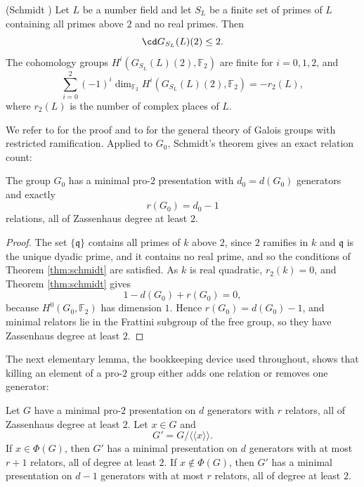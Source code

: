 \begin{theorem}\label{thm:schmidt}
(Schmidt \cite{Schmidt})  Let $L$ be a number field and let $S_L$ be a finite set of primes of $L$ containing all primes above $2$ and no real primes.  Then
\[
   \cd G_{S_L}(L)(2)\leq2.
\]
The cohomology groups $H^i(G_{S_L}(L)(2),\mathbb{F}_2)$ are finite for $i=0,1,2$, and
\[
  \sum_{i=0}^2(-1)^i\dim_{\mathbb{F}_2}H^i(G_{S_L}(L)(2),\mathbb{F}_2)=-r_2(L),
\]
where $r_2(L)$ is the number of complex places of $L$.
\end{theorem}

We refer to \cite{Schmidt} for the proof and to \cite[Chapters VIII and X]{NSW} for the general theory of Galois groups with restricted ramification.  Applied to $G_0$, Schmidt's theorem gives an exact relation count:

\begin{lemma}\label{lem:base}
The group $G_0$ has a minimal pro-$2$ presentation with $d_0=d(G_0)$ generators and exactly
\[
   r(G_0)=d_0-1
\]
relations, all of Zassenhaus degree at least $2$.
\end{lemma}

\begin{proof}
The set $\{\mathfrak{q}\}$ contains all primes of $k$ above $2$, since $2$ ramifies in $k$ and $\mathfrak{q}$ is the unique dyadic prime, and it contains no real prime, and so the conditions of Theorem \ref{thm:schmidt} are satisfied.  As $k$ is real quadratic, $r_2(k)=0$, and Theorem \ref{thm:schmidt} gives
\[
   1-d(G_0)+r(G_0)=0,
\]
because $H^0(G_0,\mathbb{F}_2)$ has dimension $1$.  Hence $r(G_0)=d(G_0)-1$, and minimal relators lie in the Frattini subgroup of the free group, so they have Zassenhaus degree at least $2$.
\end{proof}

The next elementary lemma, the bookkeeping device used throughout, shows that killing an element of a pro-$2$ group either adds one relation or removes one generator:

\begin{lemma}\label{lem:kill}
Let $G$ have a minimal pro-$2$ presentation on $d$ generators with $r$ relators, all of Zassenhaus degree at least $2$.  Let $x\in G$ and
\[
   G'=G/\langle\!\langle x\rangle\!\rangle.
\]
If $x\in\Phi(G)$, then $G'$ has a minimal presentation on $d$ generators with at most $r+1$ relators, all of degree at least $2$.  If $x\notin\Phi(G)$, then $G'$ has a minimal presentation on $d-1$ generators with at most $r$ relators, all of degree at least $2$.
\end{lemma}

